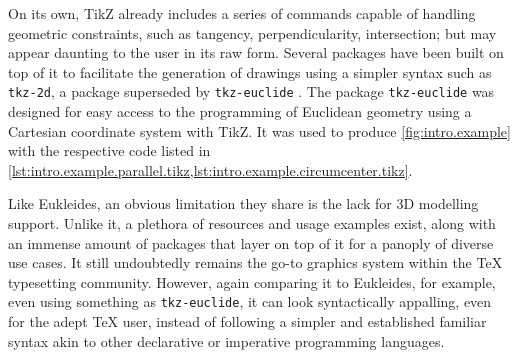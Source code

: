 On its own, \acs{TikZ} already includes a series of commands capable of handling
geometric constraints, such as tangency, perpendicularity, intersection; but may
appear daunting to the user in its raw form.  Several packages have been built
on top of it to facilitate the generation of drawings using a simpler syntax
such as \texttt{tkz-2d}, a package superseded by \texttt{tkz-euclide}
\cite{Matthes:2011:tkz-euclide-manual}.  The package \texttt{tkz-euclide} was
designed for easy access to the programming of Euclidean geometry using a
Cartesian coordinate system with TikZ.  It was used to produce
\cref{fig:intro.example} with the respective code listed in
\cref{lst:intro.example.parallel.tikz,lst:intro.example.circumcenter.tikz}.

Like Eukleides, an obvious limitation they share is the lack for 3D modelling
support.  Unlike it, a plethora of resources and usage examples exist, along
with an immense amount of packages that layer on top of it for a panoply of
diverse use cases.  It still undoubtedly remains the go-to graphics system
within the \TeX{} typesetting community.  However, again comparing it to
Eukleides, for example, even using something as \texttt{tkz-euclide}, it can
look syntactically appalling, even for the adept \TeX{} user, instead of
following a simpler and established familiar syntax akin to other declarative or
imperative programming languages.
